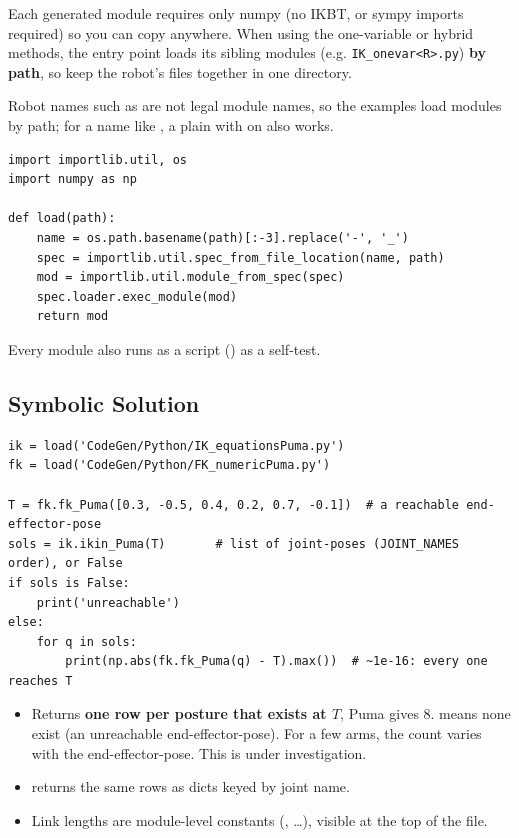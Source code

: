 \documentclass[11pt]{article}
\begin{document}
Each generated module requires only numpy  (no IKBT, or sympy imports required) so
you can copy  anywhere.  When using the  one-variable or hybrid
methods, the entry point loads its sibling modules (e.g. {\tt IK\_onevar<R>.py})
\textbf{by path}, so keep the
robot's files together in one directory.

Robot names such as  are not legal module names, so the examples load
modules by path;  for a name like , a plain
 with  on  also
works.

\begin{lstlisting}
import importlib.util, os
import numpy as np

def load(path):
    name = os.path.basename(path)[:-3].replace('-', '_')
    spec = importlib.util.spec_from_file_location(name, path)
    mod = importlib.util.module_from_spec(spec)
    spec.loader.exec_module(mod)
    return mod
\end{lstlisting}

Every module also runs as a script
() as a self-test.

\subsection{Symbolic Solution}

\begin{lstlisting}
ik = load('CodeGen/Python/IK_equationsPuma.py')
fk = load('CodeGen/Python/FK_numericPuma.py')

T = fk.fk_Puma([0.3, -0.5, 0.4, 0.2, 0.7, -0.1])  # a reachable end-effector-pose
sols = ik.ikin_Puma(T)       # list of joint-poses (JOINT_NAMES order), or False
if sols is False:
    print('unreachable')
else:
    for q in sols:
        print(np.abs(fk.fk_Puma(q) - T).max())  # ~1e-16: every one reaches T
\end{lstlisting}

\begin{itemize}
\item Returns \textbf{one row per posture that exists at $T$},   Puma gives 8.   means none exist
(an unreachable end-effector-pose).  For a few arms, the count varies
  with the end-effector-pose.  This is under investigation.
\item {} returns the same rows as dicts keyed by joint
  name.
\item Link lengths are module-level constants (, \ldots), visible
  at the top of the file.
\end{itemize}
\end{document}
